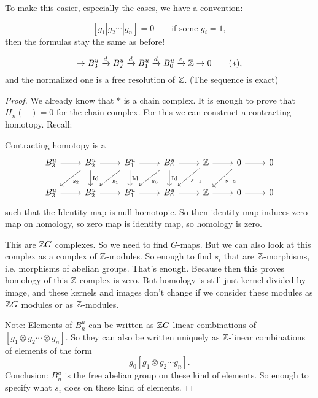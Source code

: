 To make this easier, especially the cases, we have a convention:

\[
    [g_1 | g_2 \cdots | g_n] = 0  \qquad \text{if some $g_i = 1$}
,\] 
then the formulas stay the same as before!

\begin{theorem}[6.5.3]
    \[
        \to  B^u_3 
        \xrightarrow{d}  B^u_2
        \xrightarrow{d}  B^u_1
        \xrightarrow{d}  B^u_0
        \xrightarrow{\varepsilon} \mathbb{Z}
        \to  0 \tag{$*$}
    ,\] 
    and the normalized one is a free resolution of $\mathbb{Z}$. (The sequence is exact)
\end{theorem}
\begin{proof}
    We already know that $*$ is a chain complex.
    It is enough to prove that $H_n(-)= 0$ for the chain complex.
    For this we can construct a contracting homotopy.
Recall:
\begin{definition}
Contracting homotopy is a 
\[
    \begin{tikzcd}
        B^u_3 \arrow[r, ""] 
        &B^u_2 \arrow[r, ""]  \arrow[dl, "s_2"] \arrow[d, "\operatorname{Id}"]
        &B^u_1 \arrow[r, ""] \arrow[dl, "s_1"] \arrow[d, "\operatorname{Id}"]
        &B^u_0 \arrow[r, ""] \arrow[dl, "s_0"] \arrow[d, "\operatorname{Id}"]
        &\Z \arrow[r, ""] \arrow[dl, "s_{-1}"]
        &0 \arrow[r, ""] \arrow[dl, "s_{-2}"]
        &0 \\
        B^u_3 \arrow[r, ""]
        &B^u_2 \arrow[r, ""]
        &B^u_1 \arrow[r, ""]
        &B^u_0 \arrow[r, ""]
        &\Z \arrow[r, ""]
        &0 \arrow[r, ""]
        &0 
    \end{tikzcd}
\]
such that the Identity map is null homotopic. 
So then identity map induces zero map on homology, so zero map is identity map, so homology is zero.
\end{definition}
This are $\mathbb{Z} G$ complexes. So we need to find $G$-maps.
But we can also look at this complex as a complex of $\mathbb{Z}$-modules.
So enough to find $s_i$ that are $\mathbb{Z}$-morphisms,  i.e. morphisms of abelian groups.
That's enough.
Because then this proves homology of this $\mathbb{Z}$-complex is zero. But homology is still just kernel divided by image, and these kernels and images don't change if we consider these modules as $\mathbb{Z} G$ modules or as $\mathbb{Z}$-modules.

Note: Elements of $B_n^{u}$ can be written as  $\mathbb{Z} G$ linear combinations of $[g_1 \otimes g_2 \cdots \otimes g_n]$.
So they can also be written uniquely as $\mathbb{Z}$-linear combinations of elements of the form 
\[
    g_0[g_1 \otimes g_2 \cdots g_n]
.\] 
Conclusion: $B_n^{u}$ is the free abelian group on these kind of elements.
So enough to specify what $s_i$ does on these kind of elements.


\end{proof}
